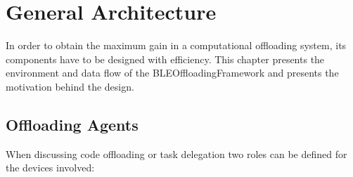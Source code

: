 \chapter{General Architecture}
\label{chapter:architecture}

In order to obtain the maximum gain in a computational offloading system, its components have to be designed with efficiency. This chapter presents the environment and data flow of the BLEOffloadingFramework and presents the motivation behind the design.

\section{Offloading Agents}
\label{agents}

When discussing code offloading or task delegation two roles can be defined for the devices involved:

